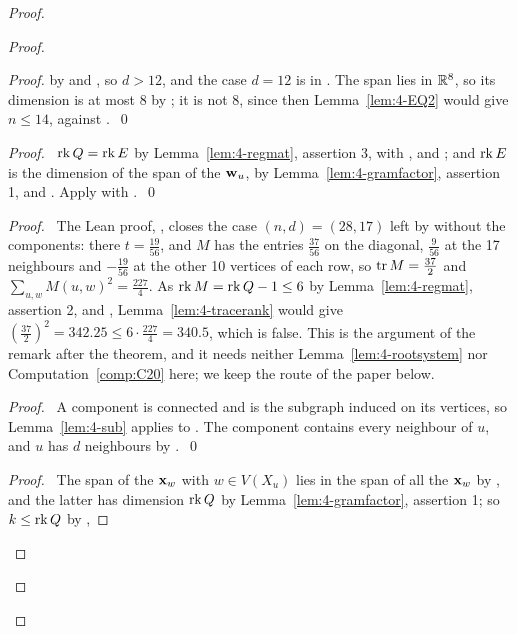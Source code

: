 \begin{proof}
\begin{proof}
\begin{proof}
   by  and , so $d>12$, and the case $d=12$ is in . The span lies
   in ${\mathbb R}^8$, so its dimension is at most 8 by ; it is not 8, since
   then Lemma~\ref{lem:4-EQ2} would give $n\le14$, against .~\qed\end{proof}
  \begin{proof}\pf\ $\mathop{\mathrm{rk}}\nolimits Q=\mathop{\mathrm{rk}}\nolimits E$ by Lemma~\ref{lem:4-regmat}, assertion 3, with ,
    and ; and $\mathop{\mathrm{rk}}\nolimits E$ is the dimension of the span of the ${\mathbf w}_u$, by
   Lemma~\ref{lem:4-gramfactor}, assertion 1, and . Apply 
   with .~\qed\end{proof}
  \begin{proof}
   \new\ The Lean proof, , closes the case
   $(n,d)=(28,17)$ left by  without the components: there $t=\frac{19}{56}$, and
   $M$ has the entries $\frac{37}{56}$ on the diagonal, $\frac9{56}$ at the 17 neighbours and
   $-\frac{19}{56}$ at the other 10 vertices of each row, so $\mathop{\mathrm{tr}}\nolimits M=\frac{37}2$ and
   $\sum_{u,w}M(u,w)^2=\frac{227}4$. As $\mathop{\mathrm{rk}}\nolimits M=\mathop{\mathrm{rk}}\nolimits Q-1\le6$ by Lemma~\ref{lem:4-regmat},
   assertion 2, and , Lemma~\ref{lem:4-tracerank} would give
   $(\frac{37}2)^2=342.25\le6\cdot\frac{227}4=340.5$, which is false. This is the argument of the
   remark after the theorem, and it needs neither Lemma~\ref{lem:4-rootsystem} nor
   Computation~\ref{comp:C20} here; we keep the route of the paper below.
   \begin{proof}\pf\ A component is connected and is the subgraph induced on its vertices, so
    Lemma~\ref{lem:4-sub} applies to . The component contains every neighbour of $u$,
    and $u$ has $d$ neighbours by .~\qed\end{proof}
   \begin{proof}\pf\ The span of the ${\mathbf x}_w$ with $w\in V(X_u)$ lies in the span of all the
    ${\mathbf x}_w$ by , and the latter has dimension $\mathop{\mathrm{rk}}\nolimits Q$ by
    Lemma~\ref{lem:4-gramfactor}, assertion 1; so $k\le\mathop{\mathrm{rk}}\nolimits Q$ by ,

\end{proof}
\end{proof}
\end{proof}
\end{proof}

